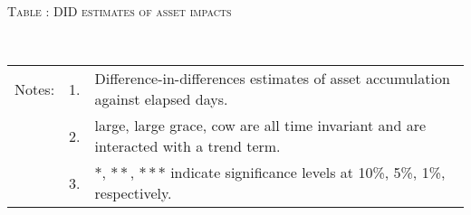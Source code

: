 \begin{table}
\hfil\textsc{\footnotesize Table \thetable: DID estimates of asset impacts\label{FDasset}}\\
\setlength{\tabcolsep}{1pt}
\renewcommand{\arraystretch}{.6}
\hfil{}\\
\renewcommand{\arraystretch}{1}

\vspace{-4ex}
\hfil\begin{tabular}{>{\hfill\scriptsize}p{1cm}<{}>{\hfill\scriptsize}p{.25cm}<{}>{\scriptsize}p{11.5cm}<{\hfill}}
Notes:& 1. & Difference-in-differences estimates of asset accumulation against elapsed days. \\[-1ex]
& 2. & \textsf{large, large grace, cow} are all time invariant and are interacted with a trend term. \\
& 3. & $*$, $**$, $***$ indicate significance levels at 10\%, 5\%, 1\%, respectively.\\
\end{tabular}
\end{table}


{\footnotesize
\setlength{\baselineskip}{11pt}
}


